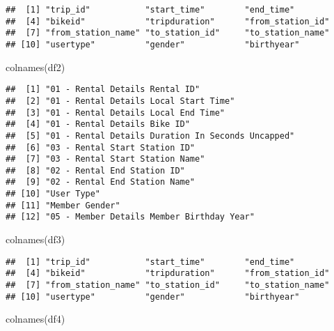\documentclass[
]{article}
\newenvironment{Shaded}{\begin{snugshade}}{\end{snugshade}}
\newcommand{\FunctionTok}[1]{\textcolor[rgb]{0.00,0.00,0.00}{#1}}
\newcommand{\NormalTok}[1]{#1}
\begin{document}
\begin{verbatim}
##  [1] "trip_id"           "start_time"        "end_time"         
##  [4] "bikeid"            "tripduration"      "from_station_id"  
##  [7] "from_station_name" "to_station_id"     "to_station_name"  
## [10] "usertype"          "gender"            "birthyear"
\end{verbatim}

\begin{Shaded}
\begin{Highlighting}[]
\FunctionTok{colnames}\NormalTok{(df2)}
\end{Highlighting}
\end{Shaded}

\begin{verbatim}
##  [1] "01 - Rental Details Rental ID"                   
##  [2] "01 - Rental Details Local Start Time"            
##  [3] "01 - Rental Details Local End Time"              
##  [4] "01 - Rental Details Bike ID"                     
##  [5] "01 - Rental Details Duration In Seconds Uncapped"
##  [6] "03 - Rental Start Station ID"                    
##  [7] "03 - Rental Start Station Name"                  
##  [8] "02 - Rental End Station ID"                      
##  [9] "02 - Rental End Station Name"                    
## [10] "User Type"                                       
## [11] "Member Gender"                                   
## [12] "05 - Member Details Member Birthday Year"
\end{verbatim}

\begin{Shaded}
\begin{Highlighting}[]
\FunctionTok{colnames}\NormalTok{(df3)}
\end{Highlighting}
\end{Shaded}

\begin{verbatim}
##  [1] "trip_id"           "start_time"        "end_time"         
##  [4] "bikeid"            "tripduration"      "from_station_id"  
##  [7] "from_station_name" "to_station_id"     "to_station_name"  
## [10] "usertype"          "gender"            "birthyear"
\end{verbatim}

\begin{Shaded}
\begin{Highlighting}[]
\FunctionTok{colnames}\NormalTok{(df4)}
\end{Highlighting}
\end{Shaded}
\end{document}

